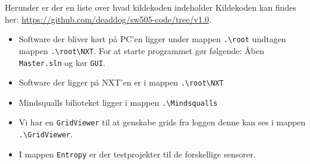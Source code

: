 Herunder er der en liste over hvad kildekoden indeholder
Kildekoden kan findes her: \url{https://github.com/deaddog/sw505-code/tree/v1.0}.
\begin{itemize}
\item Software der bliver kørt på PC'en ligger under mappen \lstinline[style=c]!.\root! undtagen mappen \lstinline[style=c]!.\root\NXT!.
For at starte programmet gør følgende:
Åben \lstinline[style=c]!Master.sln! og kør \lstinline[style=c]!GUI!.
\item Software der ligger på NXT'en er i mappen \lstinline[style=c]!.\root\NXT!
\item Mindsqualls bilioteket ligger i mappen \lstinline[style=c]!.\Mindsqualls!
\item Vi har en \lstinline[style=c]!GridViewer! til at genskabe grids fra loggen denne kan ses i mappen \lstinline[style=c]!.\GridViewer!.
\item I mappen \lstinline[style=c]!Entropy! er der testprojekter til de forskellige sensorer.
\end{itemize}